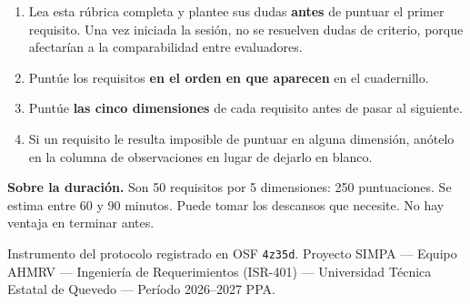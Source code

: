 \documentclass[11pt,a4paper]{article}
\begin{document}
\begin{enumerate}[leftmargin=1.6em]
  \item Lea esta rúbrica completa y plantee sus dudas \textbf{antes} de puntuar
        el primer requisito. Una vez iniciada la sesión, no se resuelven dudas
        de criterio, porque afectarían a la comparabilidad entre evaluadores.
  \item Puntúe los requisitos \textbf{en el orden en que aparecen} en el
        cuadernillo.
  \item Puntúe \textbf{las cinco dimensiones} de cada requisito antes de pasar
        al siguiente.
  \item Si un requisito le resulta imposible de puntuar en alguna dimensión,
        anótelo en la columna de observaciones en lugar de dejarlo en blanco.
\end{enumerate}

\begin{tcolorbox}[colback=grisclaro,colframe=uteqverde,boxrule=0.6pt,arc=2pt]
\textbf{Sobre la duración.} Son 50 requisitos por 5 dimensiones: 250
puntuaciones. Se estima entre 60 y 90 minutos. Puede tomar los descansos que
necesite. No hay ventaja en terminar antes.
\end{tcolorbox}

\vfill
{\footnotesize
Instrumento del protocolo registrado en OSF \texttt{4z35d}. Proyecto SIMPA ---
Equipo AHMRV --- Ingeniería de Requerimientos (ISR-401) --- Universidad Técnica
Estatal de Quevedo --- Período 2026--2027 PPA.}
\end{document}
